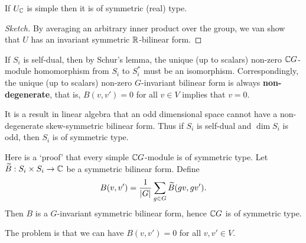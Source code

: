 \begin{prop}
  If $U_{\mathbb{C}}$ is simple then it is of symmetric (real) type.
\end{prop}

\begin{proof}[Sketch]
  By averaging an arbitrary inner product over the group, we van show that $U$ has an invariant symmetric $\mathbb{R}$-bilinear form.
\end{proof}

\begin{rmk}
  \lv
  \begin{enum}
    \io
    If $S_i$ is self-dual, then by Schur's lemma, the unique (up to scalars) non-zero $\mathbb{C} G$-module homomorphism from $S_i$ to $S_i^*$ must be an isomorphism.
    Correspondingly, the unique (up to scalars) non-zero $G$-invariant bilinear form is always \textbf{non-degenerate}, that is, $B(v,v')=0$ for all $v \in V$ implies that $v=0$.

    \io
    It is a result in linear algebra that an odd dimensional space cannot have a non-degenerate skew-symmetric bilinear form.
    Thus if $S_i$ is self-dual and $\dim S_i$ is odd, then $S_i$ is of symmetric type.
  \end{enum}
\end{rmk}

\begin{rmk}
  Here is a `proof' that every simple $\mathbb{C} G$-module is of symmetric type.
  Let $\widetilde B: S_i \times S_i \to \mathbb{C}$ be a symmetric bilinear form.
  Define
  \[ B(v,v') = \frac{1}{\left\lvert G \right\rvert} \sum_{g \in G} \widetilde B(gv,gv'). \]
  Then $B$ is a $G$-invariant symmetric bilinear form, hence $\mathbb{C} G$ is of symmetric type.

  The problem is that we can have $B(v,v')=0$ for all $v,v' \in V$.
\end{rmk}
